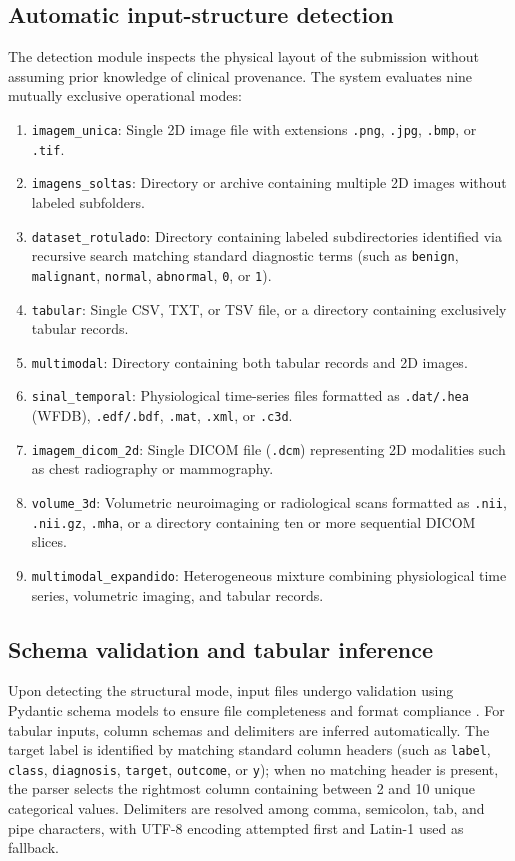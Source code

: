 \subsection{Automatic input-structure detection}
The detection module inspects the physical layout of the submission without assuming prior knowledge of clinical provenance. The system evaluates nine mutually exclusive operational modes:
\begin{enumerate}
    \item \texttt{imagem\_unica}: Single 2D image file with extensions \texttt{.png}, \texttt{.jpg}, \texttt{.bmp}, or \texttt{.tif}.
    \item \texttt{imagens\_soltas}: Directory or archive containing multiple 2D images without labeled subfolders.
    \item \texttt{dataset\_rotulado}: Directory containing labeled subdirectories identified via recursive search matching standard diagnostic terms (such as \texttt{benign}, \texttt{malignant}, \texttt{normal}, \texttt{abnormal}, \texttt{0}, or \texttt{1}).
    \item \texttt{tabular}: Single CSV, TXT, or TSV file, or a directory containing exclusively tabular records.
    \item \texttt{multimodal}: Directory containing both tabular records and 2D images.
    \item \texttt{sinal\_temporal}: Physiological time-series files formatted as \texttt{.dat/.hea} (WFDB), \texttt{.edf/.bdf}, \texttt{.mat}, \texttt{.xml}, or \texttt{.c3d}.
    \item \texttt{imagem\_dicom\_2d}: Single DICOM file (\texttt{.dcm}) representing 2D modalities such as chest radiography or mammography.
    \item \texttt{volume\_3d}: Volumetric neuroimaging or radiological scans formatted as \texttt{.nii}, \texttt{.nii.gz}, \texttt{.mha}, or a directory containing ten or more sequential DICOM slices.
    \item \texttt{multimodal\_expandido}: Heterogeneous mixture combining physiological time series, volumetric imaging, and tabular records.
\end{enumerate}

\subsection{Schema validation and tabular inference}
Upon detecting the structural mode, input files undergo validation using Pydantic schema models to ensure file completeness and format compliance \cite{polyzotis2018data}. For tabular inputs, column schemas and delimiters are inferred automatically. The target label is identified by matching standard column headers (such as \texttt{label}, \texttt{class}, \texttt{diagnosis}, \texttt{target}, \texttt{outcome}, or \texttt{y}); when no matching header is present, the parser selects the rightmost column containing between 2 and 10 unique categorical values. Delimiters are resolved among comma, semicolon, tab, and pipe characters, with UTF-8 encoding attempted first and Latin-1 used as fallback.

